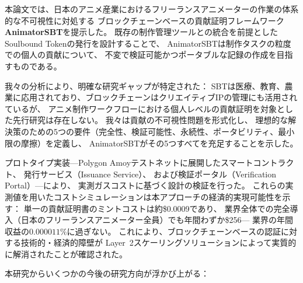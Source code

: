 

本論文では、日本のアニメ産業におけるフリーランスアニメーターの作業の体系的な不可視性に対処する
ブロックチェーンベースの貢献証明フレームワーク\textbf{AnimatorSBT}を提示した。
既存の制作管理ツールとの統合を前提としたSoulbound Tokenの発行を設計することで、
AnimatorSBTは制作タスクの粒度での個人の貢献について、
不変で検証可能かつポータブルな記録の作成を目指すものである。

我々の分析により、明確な研究ギャップが特定された：
SBTは医療、教育、農業に応用されており、ブロックチェーンはクリエイティブIPの管理にも活用されているが、
アニメ制作ワークフローにおける個人レベルの貢献証明を対象とした先行研究は存在しない。
我々は貢献の不可視性問題を形式化し、
理想的な解決策のための5つの要件（完全性、検証可能性、永続性、ポータビリティ、最小限の摩擦）を定義し、
AnimatorSBTがその5つすべてを充足することを示した。

プロトタイプ実装---Polygon Amoyテストネットに展開したスマートコントラクト、
発行サービス（Issuance Service）、
および検証ポータル（Verification Portal）---により、
実測ガスコストに基づく設計の検証を行った。
これらの実測値を用いたコストシミュレーションは本アプローチの経済的実現可能性を示す：
単一の貢献証明書のミントコストは約\$0.0009であり、
業界全体での完全導入（日本のフリーランスアニメーター全員）でも年間わずか\$256---
業界の年間収益の$0.000011\%$に過ぎない。
これにより、ブロックチェーンベースの認証に対する技術的・経済的障壁が
Layer~2スケーリングソリューションによって実質的に解消されたことが確認された。


本研究からいくつかの今後の研究方向が浮かび上がる：

